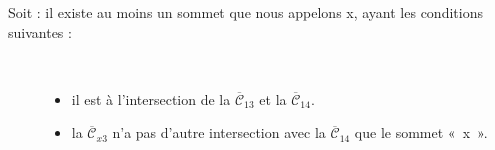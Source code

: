 \documentclass[french]{report}
\begin{document}
\begin{adjustwidth}{3.5em}{0pt}
\begin{description}
	\item[Soit : il existe au moins un sommet que nous appelons x, ayant les conditions suivantes :]\
	\begin{itemize}[label=--]
		\item il est à l'intersection de la $\overline{\mathcal{C}}_{13}$ et la $\overline{\mathcal{C}}_{14}$.
		\item la $\overline{\mathcal{C}}_{x3}$ n'a pas d'autre intersection avec la  $\overline{\mathcal{C}}_{14}$ que le sommet «~x~».\\
	\end{itemize}


\end{description}
\end{adjustwidth}
\end{document}
